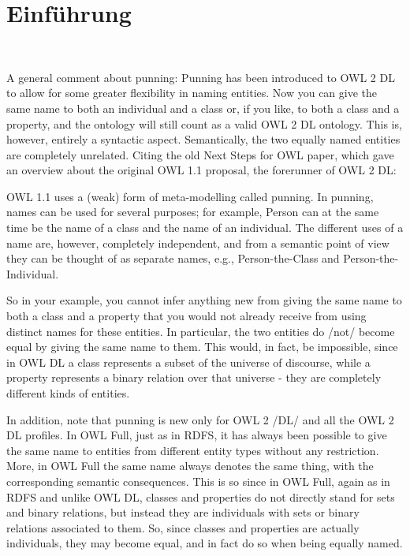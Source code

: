 \chapter{Einführung}\label{ch:einleitung}

\\
\begin{deprecated}
\cite{davis93}

A general comment about punning: Punning has been introduced to OWL 2 DL to
allow for some greater flexibility in naming entities. Now you can give the
same name to both an individual and a class or, if you like, to both a class
and a property, and the ontology will still count as a valid OWL 2 DL
ontology. This is, however, entirely a syntactic aspect. Semantically, the two
equally named entities are completely unrelated. Citing the old Next Steps for
OWL paper, which gave an overview about the original OWL 1.1 proposal, the
forerunner of OWL 2 DL:

OWL 1.1 uses a (weak) form of meta-modelling called punning. In punning, names
can be used for several purposes; for example, Person can at the same time be
the name of a class and the name of an individual. The different uses of a
name are, however, completely independent, and from a semantic point of view
they can be thought of as separate names, e.g., Person-the-Class and
Person-the-Individual.

So in your example, you cannot infer anything new from giving the same name to
both a class and a property that you would not already receive from using
distinct names for these entities. In particular, the two entities do /not/
become equal by giving the same name to them. This would, in fact, be
impossible, since in OWL DL a class represents a subset of the universe of
discourse, while a property represents a binary relation over that universe -
they are completely different kinds of entities.

In addition, note that punning is new only for OWL 2 /DL/ and all the OWL 2 DL
profiles. In OWL Full, just as in RDFS, it has always been possible to give
the same name to entities from different entity types without any
restriction. More, in OWL Full the same name always denotes the same thing,
with the corresponding semantic consequences. This is so since in OWL Full,
again as in RDFS and unlike OWL DL, classes and properties do not directly
stand for sets and binary relations, but instead they are individuals with
sets or binary relations associated to them. So, since classes and properties
are actually individuals, they may become equal, and in fact do so when being
equally named.


\end{deprecated}

